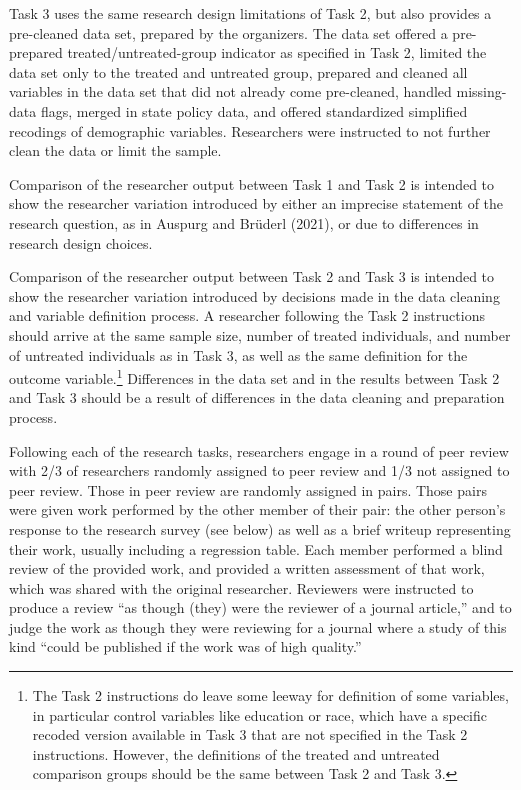 \documentclass[
  letterpaper,
  DIV=11,
  numbers=noendperiod]{scrartcl}
\begin{document}
Task 3 uses the same research design limitations of Task 2, but also
provides a pre-cleaned data set, prepared by the organizers. The data
set offered a pre-prepared treated/untreated-group indicator as
specified in Task 2, limited the data set only to the treated and
untreated group, prepared and cleaned all variables in the data set that
did not already come pre-cleaned, handled missing-data flags, merged in
state policy data, and offered standardized simplified recodings of
demographic variables. Researchers were instructed to not further clean
the data or limit the sample.

Comparison of the researcher output between Task 1 and Task 2 is
intended to show the researcher variation introduced by either an
imprecise statement of the research question, as in Auspurg and Brüderl
(2021), or due to differences in research design choices.

Comparison of the researcher output between Task 2 and Task 3 is
intended to show the researcher variation introduced by decisions made
in the data cleaning and variable definition process. A researcher
following the Task 2 instructions should arrive at the same sample size,
number of treated individuals, and number of untreated individuals as in
Task 3, as well as the same definition for the outcome
variable.\footnote{The Task 2 instructions do leave some leeway for
  definition of some variables, in particular control variables like
  education or race, which have a specific recoded version available in
  Task 3 that are not specified in the Task 2 instructions. However, the
  definitions of the treated and untreated comparison groups should be
  the same between Task 2 and Task 3.} Differences in the data set and
in the results between Task 2 and Task 3 should be a result of
differences in the data cleaning and preparation process.

Following each of the research tasks, researchers engage in a round of
peer review with 2/3 of researchers randomly assigned to peer review and
1/3 not assigned to peer review. Those in peer review are randomly
assigned in pairs. Those pairs were given work performed by the other
member of their pair: the other person's response to the research survey
(see below) as well as a brief writeup representing their work, usually
including a regression table. Each member performed a blind review of
the provided work, and provided a written assessment of that work, which
was shared with the original researcher. Reviewers were instructed to
produce a review ``as though (they) were the reviewer of a journal
article,'' and to judge the work as though they were reviewing for a
journal where a study of this kind ``could be published if the work was
of high quality.''
\end{document}
